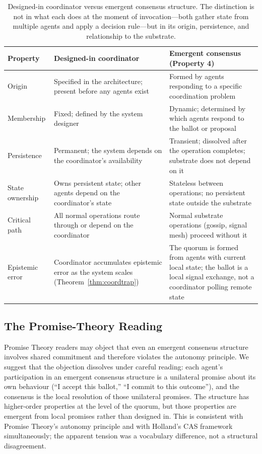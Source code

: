 \documentclass[11pt]{article}
\theoremstyle{definition}
\theoremstyle{plain}
\theoremstyle{plain}
\begin{document}
\begin{table}[!ht]
\centering
\small
\begin{tabularx}{\textwidth}{lXX}
\toprule
\textbf{Property} &
\textbf{Designed-in coordinator} &
\textbf{Emergent consensus (Property 4)} \\
\midrule
Origin &
Specified in the architecture; present before any agents exist &
Formed by agents responding to a specific coordination problem \\
\addlinespace
Membership &
Fixed; defined by the system designer &
Dynamic; determined by which agents respond to the ballot or proposal \\
\addlinespace
Persistence &
Permanent; the system depends on the coordinator's availability &
Transient; dissolved after the operation completes; substrate does not depend on it \\
\addlinespace
State ownership &
Owns persistent state; other agents depend on the coordinator's state &
Stateless between operations; no persistent state outside the substrate \\
\addlinespace
Critical path &
All normal operations route through or depend on the coordinator &
Normal substrate operations (gossip, signal mesh) proceed without it \\
\addlinespace
Epistemic error &
Coordinator accumulates epistemic error as the system scales (Theorem~\ref{thm:coordtrap}) &
The quorum is formed from agents with current local state; the ballot is a local signal exchange, not a coordinator polling remote state \\
\bottomrule
\end{tabularx}
\caption{Designed-in coordinator versus emergent consensus structure. The
distinction is not in what each does at the moment of invocation---both
gather state from multiple agents and apply a decision rule---but in its
origin, persistence, and relationship to the substrate.}
\label{tab:designed-vs-emergent}
\end{table}

\subsection{The Promise-Theory Reading}

Promise Theory readers may object that even an emergent consensus structure
involves shared commitment and therefore violates the autonomy principle. We
suggest that the objection dissolves under careful reading: each agent's
participation in an emergent consensus structure is a unilateral promise
about its own behaviour (``I accept this ballot,'' ``I commit to this
outcome''), and the consensus is the local resolution of those unilateral
promises. The structure has higher-order properties at the level of the
quorum, but those properties are emergent from local promises rather than
designed in. This is consistent with Promise Theory's autonomy principle and
with Holland's CAS framework simultaneously; the apparent tension was a
vocabulary difference, not a structural disagreement.
\end{document}
